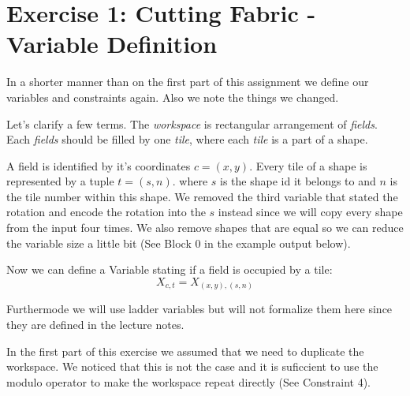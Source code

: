 \documentclass{base}
\begin{document}



\section*{Exercise 1: Cutting Fabric - Variable Definition}

In a shorter manner than on the first part of this assignment we define our variables and constraints again. Also we note the things we changed.

Let's clarify a few terms. The \textit{workspace} is rectangular arrangement of \textit{fields}. Each \textit{fields} should be filled by one \textit{tile}, where each \textit{tile} is a part of a shape.

A field is identified by it's coordinates $c = (x,y)$.
Every tile of a shape is represented by a tuple $t = (s, n)$. where $s$ is the shape id it belongs to and $n$ is the tile number within this shape. We removed the third variable that stated the rotation and encode the rotation into the $s$ instead since we will copy every shape from the input four times. We also remove shapes that are equal so we can reduce the variable size a little bit (See Block 0 in the example output below).

Now we can define a Variable stating if a field is occupied by a tile:
$$X_{c,t} = X_{(x,y),(s,n)}$$

Furthermode we will use ladder variables but will not formalize them here since they are defined in the lecture notes.

In the first part of this exercise we assumed that we need to duplicate the workspace. We noticed that this is not the case and it is suficcient to use the modulo operator to make the workspace repeat directly (See Constraint 4).
\end{document}
